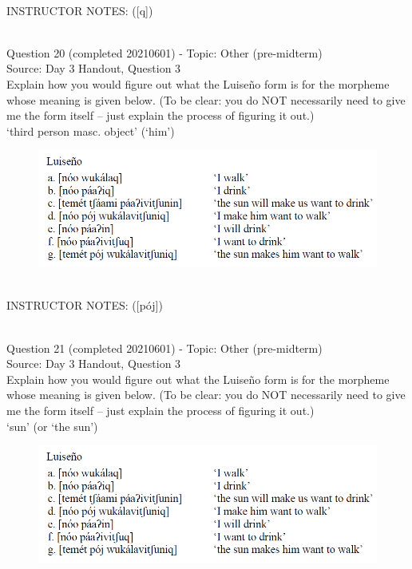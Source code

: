 \documentclass[12pt]{article}
\begin{document}
~\\
INSTRUCTOR NOTES: ([q])


~\\

{\large Question 20} (completed 20210601) - Topic: Other (pre-midterm)\\
Source: Day 3 Handout, Question 3\\

Explain how you would figure out what the Luiseño form is for the morpheme whose meaning is given below. (To be clear: you do NOT necessarily need to give me the form itself -- just explain the process of figuring it out.)\\

‘third person masc. object’ (‘him’)

\begin{figure}[H]
\includegraphics{../images/luiseno.png}
\end{figure}

~\\
INSTRUCTOR NOTES: ([pój])


~\\

{\large Question 21} (completed 20210601) - Topic: Other (pre-midterm)\\
Source: Day 3 Handout, Question 3\\

Explain how you would figure out what the Luiseño form is for the morpheme whose meaning is given below. (To be clear: you do NOT necessarily need to give me the form itself -- just explain the process of figuring it out.)\\

‘sun’ (or ‘the sun’)

\begin{figure}[H]
\includegraphics{../images/luiseno.png}
\end{figure}
\end{document}
